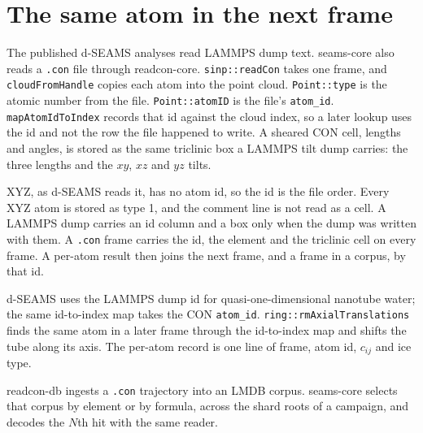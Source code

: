 \section{The same atom in the next frame}\label{sec:connectivity}
The published d-SEAMS analyses read LAMMPS dump text.
seams-core also reads a \texttt{.con} file through readcon-core.
\texttt{sinp::readCon} takes one frame, and \texttt{cloudFromHandle} copies each atom into the point cloud.
\texttt{Point::type} is the atomic number from the file.
\texttt{Point::atomID} is the file's \texttt{atom\_id}.
\texttt{mapAtomIdToIndex} records that id against the cloud index, so a later lookup uses the id and not the row the file happened to write.
A sheared CON cell, lengths and angles, is stored as the same triclinic box a LAMMPS tilt dump carries: the three lengths and the \(xy\), \(xz\) and \(yz\) tilts.

XYZ, as d-SEAMS reads it, has no atom id, so the id is the file order.
Every XYZ atom is stored as type 1, and the comment line is not read as a cell.
A LAMMPS dump carries an id column and a box only when the dump was written with them.
A \texttt{.con} frame carries the id, the element and the triclinic cell on every frame.
A per-atom result then joins the next frame, and a frame in a corpus, by that id.

d-SEAMS uses the LAMMPS dump id for quasi-one-dimensional nanotube water; the same id-to-index map takes the CON \texttt{atom\_id}.
\texttt{ring::rmAxialTranslations} finds the same atom in a later frame through the id-to-index map and shifts the tube along its axis.
The per-atom record is one line of frame, atom id, \(c_{ij}\) and ice type.

readcon-db ingests a \texttt{.con} trajectory into an LMDB corpus.
seams-core selects that corpus by element or by formula, across the shard roots of a campaign, and decodes the \(N\)th hit with the same reader.

